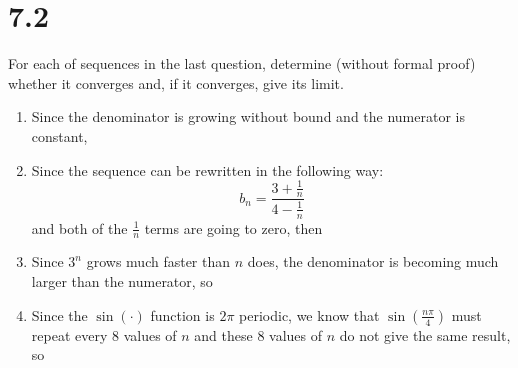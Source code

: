 \documentclass[10pt,a4paper]{article}
\theoremstyle{definition}
\begin{document}
\section*{7.2}
For each of sequences in the last question, determine (without formal proof) whether it converges and, if it converges, give its limit. 
\begin{enumerate}[label = (\alph*)]
\item Since the denominator is growing without bound and the numerator is constant, 
\item Since the sequence can be rewritten in the following way:
\[b_n = \frac{3 + \frac{1}{n}}{4 - \frac{1}{n}}\]
and both of the $\displaystyle \frac{1}{n}$ terms are going to zero, then 
\item Since $3^n$ grows much faster than $n$ does, the denominator is becoming much larger than the numerator, so 
\item Since the $\sin(\cdot)$ function is $2\pi$ periodic, we know that $\displaystyle \sin\left(\frac{n \pi}{4}\right)$ must repeat every 8 values of $n$ and these 8 values of $n$ do not give the same result, so 
\end{enumerate}
\end{document}

